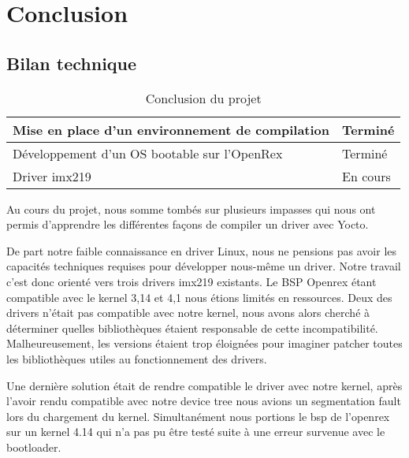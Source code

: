 
\chapter{Conclusion} %

\label{Chapter4} %


\section{Bilan technique}

\begin{table}[htp]
    \centering
    \begin{tabular}{|p{}|p{}|}
        \hline
        Mise en place d'un environnement de compilation & Terminé \\ \hline
        Développement d'un OS bootable sur l'OpenRex & Terminé \\ \hline
        Driver imx219 & En cours \\ \hline
    \end{tabular}
    \caption{Conclusion du projet} \label{tab:conclusion} 
\end{table}

Au cours du projet, nous somme tombés sur plusieurs impasses qui nous ont permis
d’apprendre les différentes façons de compiler un driver avec Yocto. \medskip

De part notre faible connaissance en driver Linux, nous ne pensions pas avoir les
capacités techniques requises pour développer nous-même un driver. Notre travail c’est
donc orienté vers trois drivers imx219 existants. Le BSP Openrex étant compatible avec le
kernel 3,14 et 4,1 nous étions limités en ressources. Deux des drivers n’était pas
compatible avec notre kernel, nous avons alors cherché à déterminer quelles
bibliothèques étaient responsable de cette incompatibilité. Malheureusement, les versions
étaient trop éloignées pour imaginer patcher toutes les bibliothèques utiles au
fonctionnement des drivers.\medskip

Une dernière solution était de rendre compatible le driver avec notre kernel, après l’avoir
rendu compatible avec notre device tree nous avions un segmentation fault lors du chargement
du kernel. Simultanément nous portions le bsp de l’openrex sur un kernel 4.14 qui n’a pas pu être
testé suite à une erreur survenue avec le bootloader.\medskip

